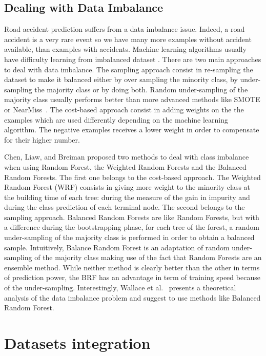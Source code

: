 \documentclass[conference]{IEEEtran}
\begin{document}
\subsection{Dealing with Data Imbalance}

Road accident prediction suffers from a data imbalance issue. Indeed, a road
accident is a very rare event so we have many more examples without accident
available, than examples with accidents. Machine learning algorithms usually
have difficulty learning from imbalanced dataset \cite{Branco2016}.
There are two main approaches to deal with data imbalance. The sampling approach
consist in re-sampling the dataset to make it balanced either by over sampling the
minority class, by under-sampling the majority class or by doing both.
Random under-sampling of the majority class usually performs better than
more advanced methods like SMOTE or NearMiss~\cite{Branco2016}.
The cost-based approach consist in adding weights on the the examples which are
used differently depending on the machine learning algorithm. The negative examples
receives a lower weight in order to compensate for their higher number.

Chen, Liaw, and Breiman\cite{Chen2004} proposed two methods to deal with class imbalance
when using Random Forest, the Weighted Random Forests and the Balanced Random Forests.
The first one belongs to the cost-based approach. The Weighted Random
Forest (WRF) consists in giving more weight to the minority class at
the building time of each tree: during the measure of the gain in
impurity and during the class prediction of each terminal node.
The second belongs to the sampling approach.
Balanced Random Forests are like Random Forests, but with a difference during the bootstrapping phase, for each tree of the forest, a random under-sampling of the
majority class is performed in order to obtain a balanced sample. Intuitively,
Balance Random Forest is an adaptation of random under-sampling of the majority
class making use of the fact that Random Forests are an ensemble method.
While neither method is clearly better than the other in terms of prediction
power, the BRF has an advantage in term of training speed because of the under-sampling. Interestingly, Wallace et al.~\cite{Wallace2011} presents a theoretical analysis of the data
imbalance problem and suggest to use methods like Balanced Random Forest.

\section{Datasets integration}
\end{document}
